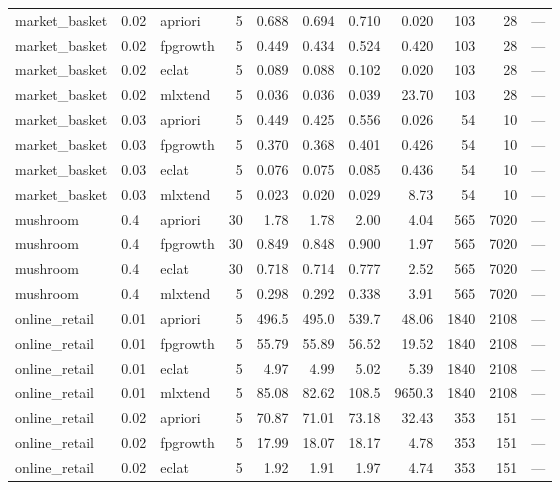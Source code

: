 \documentclass[twocolumn,10pt]{article}
\begin{document}
\begin{longtable}{p{3.0cm}llrrrrrrrp{2.4cm}}
market\_\allowbreak{}basket & 0.02 & apriori & 5 & 0.688 & 0.694 & 0.710 & 0.020 & 103 & 28 & --- \\
market\_\allowbreak{}basket & 0.02 & fpgrowth & 5 & 0.449 & 0.434 & 0.524 & 0.420 & 103 & 28 & --- \\
market\_\allowbreak{}basket & 0.02 & eclat & 5 & 0.089 & 0.088 & 0.102 & 0.020 & 103 & 28 & --- \\
market\_\allowbreak{}basket & 0.02 & mlxtend & 5 & 0.036 & 0.036 & 0.039 & 23.70 & 103 & 28 & --- \\
market\_\allowbreak{}basket & 0.03 & apriori & 5 & 0.449 & 0.425 & 0.556 & 0.026 & 54 & 10 & --- \\
market\_\allowbreak{}basket & 0.03 & fpgrowth & 5 & 0.370 & 0.368 & 0.401 & 0.426 & 54 & 10 & --- \\
market\_\allowbreak{}basket & 0.03 & eclat & 5 & 0.076 & 0.075 & 0.085 & 0.436 & 54 & 10 & --- \\
market\_\allowbreak{}basket & 0.03 & mlxtend & 5 & 0.023 & 0.020 & 0.029 & 8.73 & 54 & 10 & --- \\
mushroom & 0.4 & apriori & 30 & 1.78 & 1.78 & 2.00 & 4.04 & 565 & 7020 & --- \\
mushroom & 0.4 & fpgrowth & 30 & 0.849 & 0.848 & 0.900 & 1.97 & 565 & 7020 & --- \\
mushroom & 0.4 & eclat & 30 & 0.718 & 0.714 & 0.777 & 2.52 & 565 & 7020 & --- \\
mushroom & 0.4 & mlxtend & 5 & 0.298 & 0.292 & 0.338 & 3.91 & 565 & 7020 & --- \\
online\_\allowbreak{}retail & 0.01 & apriori & 5 & 496.5 & 495.0 & 539.7 & 48.06 & 1840 & 2108 & --- \\
online\_\allowbreak{}retail & 0.01 & fpgrowth & 5 & 55.79 & 55.89 & 56.52 & 19.52 & 1840 & 2108 & --- \\
online\_\allowbreak{}retail & 0.01 & eclat & 5 & 4.97 & 4.99 & 5.02 & 5.39 & 1840 & 2108 & --- \\
online\_\allowbreak{}retail & 0.01 & mlxtend & 5 & 85.08 & 82.62 & 108.5 & 9650.3 & 1840 & 2108 & --- \\
online\_\allowbreak{}retail & 0.02 & apriori & 5 & 70.87 & 71.01 & 73.18 & 32.43 & 353 & 151 & --- \\
online\_\allowbreak{}retail & 0.02 & fpgrowth & 5 & 17.99 & 18.07 & 18.17 & 4.78 & 353 & 151 & --- \\
online\_\allowbreak{}retail & 0.02 & eclat & 5 & 1.92 & 1.91 & 1.97 & 4.74 & 353 & 151 & --- \\

\end{longtable}
\end{document}
